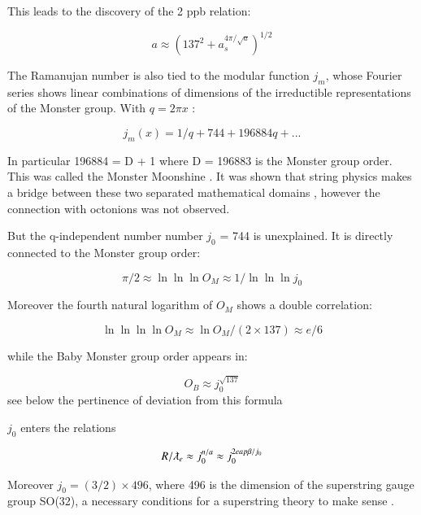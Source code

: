 \documentclass[a4paper,9pt]{article}
\begin{document}
This leads to the discovery of the 2 ppb relation:

\begin{equation}
a \approx (137^2 + a_s^{4\pi/\sqrt{a}})^{1/2}
\end{equation}

The Ramanujan number is also tied to the modular function $j_m$, whose Fourier series shows linear combinations of dimensions of the irreductible representations of the Monster group. With $q = 2\pi x$ :

\begin{equation}
j_m(x) = 1/q + 744 + 196884 q + ...
\end{equation}

In particular 196884 = D + 1 where D = 196883 is the Monster group order. This was called the Monster Moonshine \cite{Conway}. It was shown that string physics makes a bridge between these two separated mathematical domains \cite{Borcherds}, however the connection with octonions was not observed. 


But the q-independent number number $j_0$ = 744 is unexplained. It is directly connected to the Monster group order:

 \begin{equation}
 \pi/2 \approx \ln{\ln{\ln{O_M}}} \approx 1/\ln{\ln{\ln{j_0}}}
\end{equation}

Moreover the fourth natural logarithm of $O_M$ shows a double correlation:

 \begin{equation}
 \ln{\ln{\ln{\ln{O_M}}}} \approx \ln{O_M} /(2\times 137) \approx e/6
\end{equation}

while the Baby Monster group order appears in:

\begin{equation}
 O_B \approx j_0^{\sqrt{137}}
\end{equation}
see below the pertinence of deviation from this formula

$j_0$ enters the relations
 
 \begin{equation}
 R/\lambdabar_e \approx j_0^{n/a} \approx j_0^{2eap\beta/j_0} 
\end{equation}

Moreover $j_0 = (3/2) \times 496$, where 496 is the dimension of the superstring gauge group SO(32), a necessary conditions for a superstring theory to make sense \cite{Green}.
\end{document}

